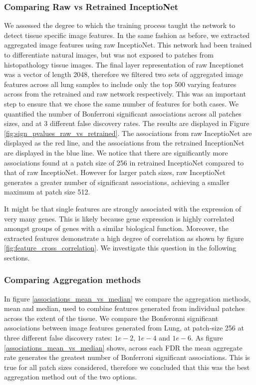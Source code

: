 \documentclass[graybox]{svmult}
\begin{document}
\subsubsection{Comparing Raw vs Retrained InceptioNet}

We assessed the degree to which the training process taught the network to detect tissue specific image features. In the same fashion as before, we extracted aggregated image features using raw InceptioNet. This network had been trained to differentiate natural images, but was not exposed to patches from histopathology tissue images. The final layer representation of raw Inceptionet was a vector of length 2048, therefore we filtered two sets of aggregated image features across all lung samples to include only the top 500 varying features across from the retrained and raw network respectively. This was an important step to ensure that we chose the same number of features for both cases. We quantified the number of Bonferroni significant associations across all patches sizes, and at 3 different false discovery rates. The results are displayed in Figure \ref{fig:sign_pvalues_raw_vs_retrained}. The associations from raw InceptioNet are displayed as the red line, and the associations from the retrained InceptionNet are displayed in the blue line. We notice that there are significantly more associations found at a patch size of 256 in retrained InceptioNet compared to that of raw InceptioNet. However for larger patch sizes, raw InceptioNet generates a greater number of significant associations, achieving a smaller maximum at patch size 512.

It might be that single features are strongly associated with the expression of very many genes. This is likely because gene expression is highly correlated amongst groups of genes with a similar biological function. Moreover, the extracted features demonstrate a high degree of correlation as shown by figure \ref{fig:feature_cross_correlation}. We investigate this question in the following sections.

\subsubsection{Comparing Aggregation methods}
In figure \ref{associations_mean_vs_median} we compare the aggregation methods, mean and median, used to combine features generated from individual patches across the extent of the tissue. We compare the Bonferonni significant associations between image features generated from Lung, at patch-size 256 at three different false discovery rates: $1e-2$, $1e-4$ and $1e-6$. As figure \ref{associations_mean_vs_median} shows, across each FDR the mean aggregate rate generates the greatest number of Bonferroni significant associations. This is true for all patch sizes considered, therefore we concluded that this was the best aggregation method out of the two options.
\end{document}
